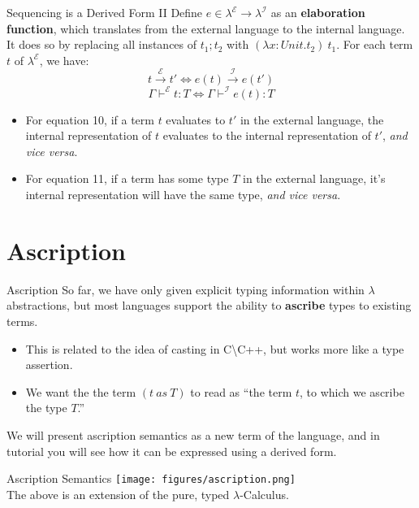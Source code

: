 \documentclass[11pt]{beamer}
\begin{document}
\begin{frame}[fragile=singleslide]{Sequencing is a Derived Form II}
Define $e \in \lambda^\mathcal{E} \rightarrow \lambda^\mathcal{I}$ as an \textbf{elaboration function}, which translates from the external language to the internal language.  It does so by replacing all instances of $t_1 ; t_2$ with $(\lambda x : Unit.t_2)\:t_1$. For each term $t$ of $\lambda^\mathcal{E}$, we have:
\begin{equation}
t \xrightarrow{\mathcal{E}} t' \iff e(t) \xrightarrow{\mathcal{I}} e(t')
\end{equation}
\begin{equation}
\Gamma \vdash^{\mathcal{E}} t : T \iff \Gamma \vdash^{\mathcal{I}} e(t) : T
\end{equation}
\begin{itemize}
\item For equation 10, if a term $t$ evaluates to $t'$ in the external language, the internal representation of $t$ evaluates to the internal representation of $t'$, \emph{and vice versa}.
\item For equation 11, if a term has some type $T$ in the external language, it's internal representation will have the same type, \emph{and vice versa}.
\end{itemize}
\end{frame}

\section[Ascription]{Ascription}
\begin{frame}[fragile=singleslide]{Ascription}
So far, we have only given explicit typing information within $\lambda$ abstractions, but most languages support the ability to \textbf{ascribe} types to existing terms.  
\begin{itemize}
\item This is related to the idea of casting in C\textbackslash C++, but works more like a type assertion.  
\item We want the the term $(t\:as\:T)$ to read as ``the term $t$, to which we ascribe the type $T$.''
\end{itemize}
We will present ascription semantics as a new term of the language, and in tutorial you will see how it can be expressed using a derived form.  
\end{frame}

\begin{frame}[fragile=singleslide]{Ascription Semantics}
\texttt{[image: figures/ascription.png]} \\
The above is an extension of the pure, typed $\lambda$-Calculus. \\
\end{frame}
\end{document}
